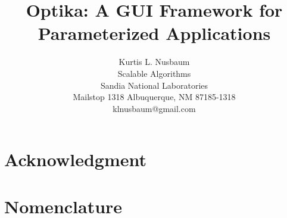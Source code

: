 \documentclass[pdf,12pt,strict]{SANDreport}
\title{Optika: A GUI Framework for Parameterized Applications}
\author{Kurtis L. Nusbaum \\
    Scalable Algorithms \\
    Sandia National Laboratories\\
    Mailstop 1318
    Albuquerque, NM 87185-1318\\
    klnusbaum@gmail.com
    }		%
\date{}		%
\begin{document}
    \maketitle

    \begin{abstract}
    
    \end{abstract}


    \clearpage
    \section*{Acknowledgment}
    


    \cleardoublepage		%
    \tableofcontents
    \listoffigures
    \listoftables






    \clearpage
    \section*{Nomenclature}
    


    \SANDmain		%
\end{document}
